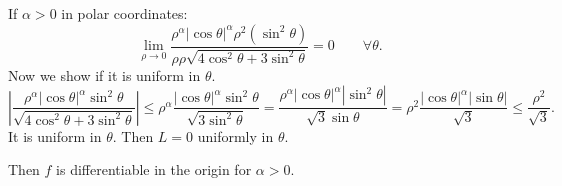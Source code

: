 \documentclass[a4paper, twoside, openany]{book}
\begin{document}
If $\alpha > 0$ in polar coordinates:
$$\lim_{\rho \rightarrow 0} \frac{\rho^{\alpha} |\cos \theta|^{\alpha} \rho^2 (\sin^2 \theta)}{\rho \rho \sqrt{4 \cos^2 \theta + 3 \sin^2 \theta}} = 0 \qquad \forall \theta.$$
Now we show if it is uniform in $\theta$.
$$|\frac{\rho^{\alpha} |\cos \theta|^{\alpha} \sin^2 \theta}{\sqrt{4 \cos^2 \theta + 3 \sin^2 \theta}}| \leq \rho^{\alpha} \frac{|\cos \theta|^{\alpha} \sin^2 \theta}{\sqrt{3 \sin^2 \theta}} = \frac{\rho^{\alpha} |\cos \theta|^{\alpha} |\sin^2 \theta|}{\sqrt{3} \sin \theta} = \rho^2 \frac{|\cos \theta|^{\alpha} |\sin \theta|}{\sqrt{3}} \leq \frac{\rho^2}{\sqrt{3}}.$$
It is uniform in $\theta$. Then $L = 0$ uniformly in $\theta$. \par  
Then $f$ is differentiable in the origin for $\alpha > 0$.
\end{document}
